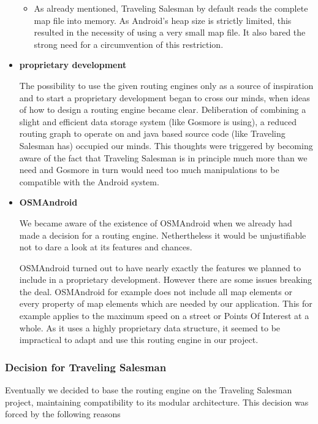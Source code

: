 \begin{itemize}
\begin{itemize}
			\item As already mentioned, Traveling Salesman by default reads the complete map file into memory. As Android's heap size is strictly limited, this resulted in the necessity of using a very small map file. It also bared the strong need for a circumvention of this restriction.
		
		\end{itemize}

	\item \textbf{proprietary development}

		The possibility to use the given routing engines only as a source of inspiration and to start a proprietary development began to cross our minds, when ideas of how to design a routing engine became clear. Deliberation of combining a slight and efficient data storage system (like Gosmore is using), a reduced routing graph to operate on and java based source code (like Traveling Salesman has) occupied our minds. This thoughts were triggered by becoming aware of the fact that Traveling Salesman is in principle much more than we need and Gosmore in turn would need too much manipulations to be compatible with the Android system.

	\item \textbf{OSMAndroid}

		We became aware of the existence of OSMAndroid when we already had made a decision for a routing engine. Nethertheless it would be unjustifiable not to dare a look at its features and chances.\newline
		
		OSMAndroid turned out to have nearly exactly the features we planned to include in a proprietary development. However there are some issues breaking the deal. OSMAndroid for example does not include all map elements or every property of map elements which are needed by our application. This for example applies to the maximum speed on a street or Points Of Interest at a whole. As it uses a highly proprietary data structure, it seemed to be impractical to adapt and use this routing engine in our project.

\end{itemize}

\subsubsection{Decision for Traveling Salesman}

Eventually we decided to base the routing engine on the Traveling Salesman project, maintaining compatibility to its modular architecture. This decision was forced by the following reasons

